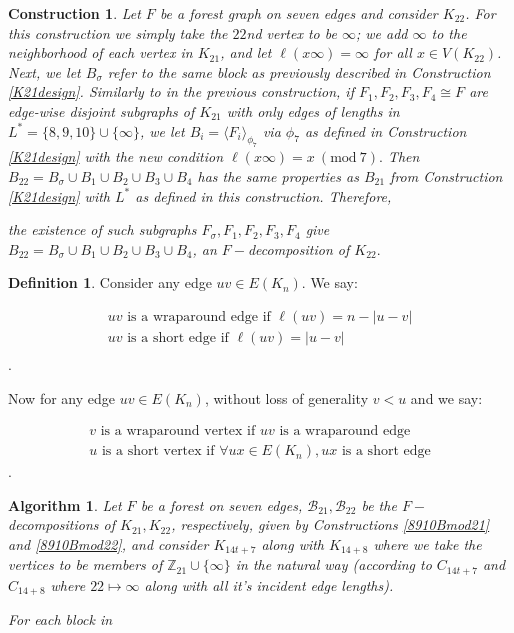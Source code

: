 \documentclass[addpoints,11pt]{exam}
\newtheorem{const}[theorem]{Construction}
\newtheorem{algo}[theorem]{Algorithm}
\theoremstyle{definition}
\newtheorem{definition}[theorem]{Definition}
\newcommand{\Mod}[1]{\ (\mathrm{mod}\ #1)}
\newcommand{\BB}{\ensuremath{\mathcal{B}}}
\newcommand{\ZZ}{\ensuremath{\mathbb{Z}}}
\begin{document}
\begin{const}\label{K22design}
  Let $F$ be a forest graph on seven edges and consider $K_{22}$. For this construction we simply take the $22$nd vertex to be $\infty$; we add $\infty$ to the neighborhood of each vertex in $K_{21}$, and let $\ell(x\infty)=\infty$ for all $x\in V(K_{22})$. Next, we let $B_{\sigma}$ refer to the same block as previously described in Construction \ref{K21design}. Similarly to in the previous construction, if $F_{1},F_{2},F_{3},F_{4}\cong F$ are edge-wise disjoint subgraphs of $K_{21}$ with only edges of lengths in $L^{*}=\{8,9,10\}\cup \{\infty\}$, we let $B_{i}=\langle F_{i}\rangle_{\phi_{7}}$ via $\phi_{7}$ as defined in Construction \ref{K21design} with the new condition $\ell(x\infty)=x\Mod{7}.$ Then $B_{22}=B_{\sigma}\cup B_{1}\cup B_{2}\cup B_{3}\cup B_{4}$ has the same properties as $B_{21}$ from Construction \ref{K21design} with $L^{*}$ as defined in this construction.
  Therefore,

  \begin{center}
  the existence of such subgraphs $F_{\sigma},F_{1},F_{2},F_{3},F_{4}$ give $B_{22}=B_{\sigma}\cup B_{1}\cup B_{2}\cup B_{3}\cup B_{4}$, an $F-$decomposition of $K_{22}.$
  \end{center}
\end{const}
\newpage

\begin{definition}
  Consider any edge $uv\in E(K_{n})$. We say:

  \begin{align}
  uv\text{ is a wraparound edge if }\ell(uv)=n-|u-v|\\
  uv\text{ is a short edge if }\ell(uv)=|u-v|\\
  \end{align}.

  Now for any edge $uv\in E(K_{n})$, without loss of generality $v<u$ and we say:   

  \begin{align}
    v\text{ is a wraparound vertex if }uv\text{ is a wraparound edge}\\
    u\text{ is a short vertex if }\forall ux\in E(K_{n}), ux\text{ is a short edge}
  \end{align}.

  
\end{definition}

\begin{algo}
Let $F$ be a forest on seven edges, $\BB_{21},\BB_{22}$ be the $F-$decompositions of $K_{21},K_{22}$, respectively, given by Constructions \ref{8910Bmod21} and \ref{8910Bmod22}, and consider $K_{14t+7}$ along with $K_{14+8}$ where we take the vertices to be members of $\ZZ_{21}\cup \{\infty\}$ in the natural way (according to $C_{14t+7}$ and $C_{14+8}$ where $22 \mapsto \infty$ along with all it's incident edge lengths).

For each block in 
\end{algo}
\end{document}
